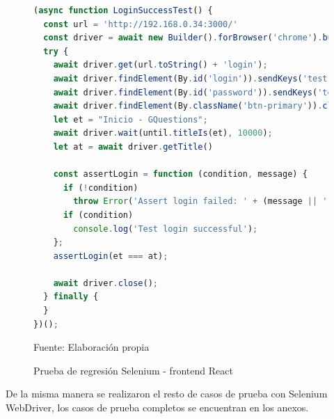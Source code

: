 \documentclass[../Main.tex]{subfiles}
\begin{document}
    \begin{figure}[H]
	\begin{Center}
    \begin{lstlisting}[language=JavaScript]
(async function LoginSuccessTest() {
  const url = 'http://192.168.0.34:3000/'
  const driver = await new Builder().forBrowser('chrome').build();
  try {
    await driver.get(url.toString() + 'login');
    await driver.findElement(By.id('login')).sendKeys('test1@gmail.com');
    await driver.findElement(By.id('password')).sendKeys('test1234');
    await driver.findElement(By.className('btn-primary')).click();
    let et = "Inicio - GQuestions";
    await driver.wait(until.titleIs(et), 10000);
    let at = await driver.getTitle()

    const assertLogin = function (condition, message) {
      if (!condition)
        throw Error('Assert login failed: ' + (message || ''));
      if (condition)
        console.log('Test login successful');
    };
    assertLogin(et === at); 
    
    await driver.close();
  } finally {
  }
})();\end{lstlisting}
        \caption{Prueba de regresión Selenium - frontend React}
	    Fuente: Elaboración propia
        \label{fig:section}
	\end{Center}
    \end{figure}
    
    \begin{justify}
    De la misma manera se realizaron el resto de casos de prueba con Selenium WebDriver, los casos de prueba completos se encuentran en los anexos.
    \end{justify}
\end{document}
